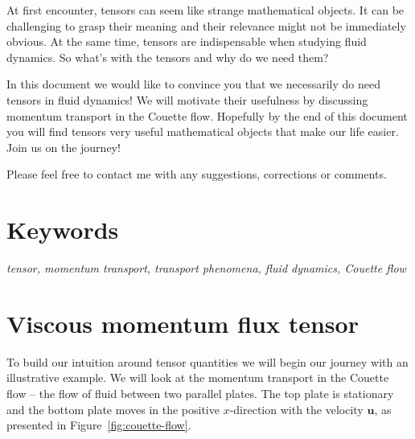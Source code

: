 \documentclass[10pt,twocolumn]{article}
\begin{document}
At first encounter, tensors can seem like strange mathematical objects. It can be challenging to grasp their meaning and their relevance might not be immediately obvious. At the same time, tensors are indispensable when studying fluid dynamics. So what's with the tensors and why do we need them?

In this document we would like to convince you that we necessarily do need tensors in fluid dynamics! We will motivate their usefulness by discussing momentum transport in the Couette flow. Hopefully by the end of this document you will find tensors very useful mathematical objects that make our life easier. Join us on the journey!

Please feel free to contact me with any suggestions, corrections or comments.

\section*{Keywords}

\textit{tensor, momentum transport, transport phenomena, fluid dynamics, Couette flow}


\section*{Viscous momentum flux tensor}

To build our intuition around tensor quantities we will begin our journey with an illustrative example. We will look at the momentum transport in the Couette flow -- the flow of fluid between two parallel plates. The top plate is stationary and the bottom plate moves in the positive $x$-direction with the velocity $\mathbf{u}$, as presented in Figure~\ref{fig:couette-flow}.
\end{document}
